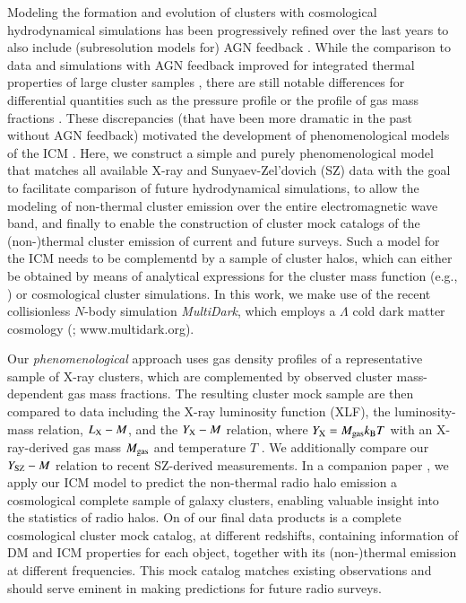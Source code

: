 \documentclass[useAMS,usenatbib]{mn2e}
\begin{document}
{Modeling the formation and evolution of clusters with cosmological
hydrodynamical simulations has been progressively refined over the last years to
also include (subresolution models for) AGN feedback
\citep[e.g.,][]{2007MNRAS.380..877S, 2008MNRAS.387.1403S, 2008ApJ...687L..53P,
  2012MNRAS.420.2662D, 2012MNRAS.424..190G, 2013MNRAS.428.2366V}. While the
comparison to data and simulations with AGN feedback improved for integrated
thermal properties of large cluster samples
\citep{2012ApJ...758...74B,2012ApJ...758...75B}, there are still notable
differences for differential quantities such as the pressure profile
\citep{2013A&A...550A.131P} or the profile of gas mass fractions
\citep{2012arXiv1209.4082B}. These discrepancies (that have been more dramatic
in the past without AGN feedback) motivated the development of phenomenological
models of the ICM \citep[e.g.,][]{2005ApJ...634..964O,
  2012MNRAS.422..686C}. Here, we construct a simple and purely phenomenological
model that matches all available X-ray and Sunyaev-Zel'dovich (SZ) data with the
goal to facilitate comparison of future hydrodynamical simulations, to allow the
modeling of non-thermal cluster emission over the entire electromagnetic wave
band, and finally to enable the construction of cluster mock catalogs of the
(non-)thermal cluster emission of current and future surveys. Such a model for
the ICM needs to be complementd by a sample of cluster halos, which can either
be obtained by means of analytical expressions for the cluster mass function
(e.g., \citealp{2001MNRAS.321..372J}) or cosmological cluster simulations. In
this work, we make use of the recent collisionless $N$-body simulation {\em
  MultiDark}, which employs a $\Lambda$ cold dark matter cosmology
(\citealp{2011arXiv1104.5130P}; www.multidark.org).

Our \emph{phenomenological} approach uses gas density profiles of a
representative sample of X-ray clusters, which are complemented by observed
cluster mass-dependent gas mass fractions. The resulting cluster mock sample are
then compared to data including the X-ray luminosity function (XLF), the
luminosity-mass relation, $L_{{\mathrm{X}}}- M$, and the $Y_{{\mathrm{X}}}-M$ relation,
where $Y_{{\mathrm{X}}}=M_{\mathrm{gas}}k_{{\mathrm{B}}}T$ with an X-ray-derived gas mass
$M_{{\mathrm{gas}}}$ and temperature $T$ \citep{2006ApJ...650..128K}. We additionally
compare our $Y_{{\mathrm{SZ}}}-M$ relation to recent SZ-derived measurements.  In a
companion paper \citep{paper2}, we apply our ICM model to predict the
non-thermal radio halo emission a cosmological complete sample of galaxy
clusters, enabling valuable insight into the statistics of radio halos.  On of
our final data products is a complete cosmological cluster mock catalog, at
different redshifts, containing information of DM and ICM properties for each
object, together with its (non-)thermal emission at different frequencies. This
mock catalog matches existing observations and should serve eminent in making
predictions for future radio surveys.

}
\end{document}
